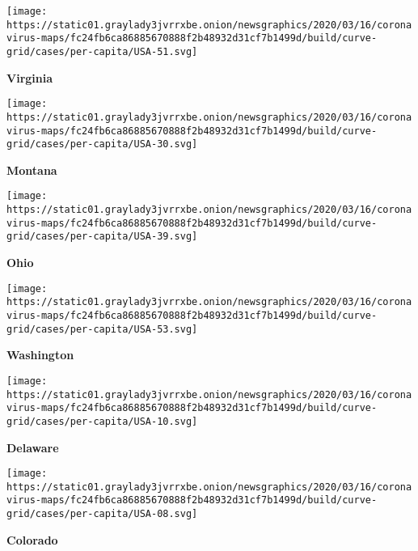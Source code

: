\href{https://www.nytimes3xbfgragh.onion/interactive/2020/us/virginia-coronavirus-cases.html}{}

\texttt{[image: https://static01.graylady3jvrrxbe.onion/newsgraphics/2020/03/16/coronavirus-maps/fc24fb6ca86885670888f2b48932d31cf7b1499d/build/curve-grid/cases/per-capita/USA-51.svg]}

\textbf{Virginia}

\href{https://www.nytimes3xbfgragh.onion/interactive/2020/us/montana-coronavirus-cases.html}{}

\texttt{[image: https://static01.graylady3jvrrxbe.onion/newsgraphics/2020/03/16/coronavirus-maps/fc24fb6ca86885670888f2b48932d31cf7b1499d/build/curve-grid/cases/per-capita/USA-30.svg]}

\textbf{Montana}

\href{https://www.nytimes3xbfgragh.onion/interactive/2020/us/ohio-coronavirus-cases.html}{}

\texttt{[image: https://static01.graylady3jvrrxbe.onion/newsgraphics/2020/03/16/coronavirus-maps/fc24fb6ca86885670888f2b48932d31cf7b1499d/build/curve-grid/cases/per-capita/USA-39.svg]}

\textbf{Ohio}

\href{https://www.nytimes3xbfgragh.onion/interactive/2020/us/washington-coronavirus-cases.html}{}

\texttt{[image: https://static01.graylady3jvrrxbe.onion/newsgraphics/2020/03/16/coronavirus-maps/fc24fb6ca86885670888f2b48932d31cf7b1499d/build/curve-grid/cases/per-capita/USA-53.svg]}

\textbf{Washington}

\href{https://www.nytimes3xbfgragh.onion/interactive/2020/us/delaware-coronavirus-cases.html}{}

\texttt{[image: https://static01.graylady3jvrrxbe.onion/newsgraphics/2020/03/16/coronavirus-maps/fc24fb6ca86885670888f2b48932d31cf7b1499d/build/curve-grid/cases/per-capita/USA-10.svg]}

\textbf{Delaware}

\href{https://www.nytimes3xbfgragh.onion/interactive/2020/us/colorado-coronavirus-cases.html}{}

\texttt{[image: https://static01.graylady3jvrrxbe.onion/newsgraphics/2020/03/16/coronavirus-maps/fc24fb6ca86885670888f2b48932d31cf7b1499d/build/curve-grid/cases/per-capita/USA-08.svg]}

\textbf{Colorado}

\href{https://www.nytimes3xbfgragh.onion/interactive/2020/us/oregon-coronavirus-cases.html}{}

